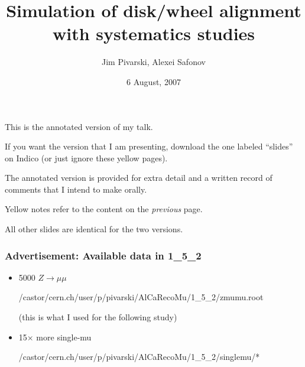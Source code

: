\documentclass[compress]{beamer}
\title{Simulation of disk/wheel alignment \\ with systematics studies}
\author{Jim Pivarski, Alexei Safonov}
\institute{Texas A\&M University}
\date{ 6 August, 2007}
\begin{document}
\frame{\titlepage}

\begin{notes}
\item This is the annotated version of my talk.
\item If you want the version that I am presenting, download the one
labeled ``slides'' on Indico (or just ignore these yellow pages).
\item The annotated version is provided for extra detail and a written
record of comments that I intend to make orally.
\item Yellow notes refer to the content on the {\it previous} page.
\item All other slides are identical for the two versions.
\end{notes}

\begin{frame}
\frametitle{Advertisement: Available data in 1\_5\_2}
\begin{itemize}
\item 5000 $Z\to\mu\mu$

{\center \small /castor/cern.ch/user/p/pivarski/AlCaRecoMu/1\_5\_2/zmumu.root}

(this is what I used for the following study)

\vfill
\item 15$\times$ more single-mu

{\center \small /castor/cern.ch/user/p/pivarski/AlCaRecoMu/1\_5\_2/singlemu/*}
\end{itemize}
\end{frame}
\end{document}
